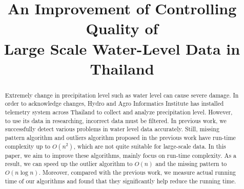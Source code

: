 \documentclass[conference]{IEEEtran}
\begin{document}
\title{An Improvement of Controlling Quality of \\Large Scale Water-Level Data in Thailand}

\author{
\and
{}
\and
{}
}

\maketitle


\begin{abstract}
Extremely change in precipitation level such as water level can cause severe damage. In order to acknowledge changes, Hydro and Agro Informatics Institute has installed telemetry system across Thailand to collect and analyze precipitation level. However, to use its data in researching, incorrect data must be filtered. In previous work, we successfully detect various problems in water level data accurately. Still, missing pattern algorithm and outliers algorithm proposed in the previous work have run-time complexity up to $O(n^2)$, which are not quite suitable for large-scale data. In this paper, we aim to improve these algorithms, mainly focus on run-time complexity. As a result, we can speed up the outlier algorithm to $O(n)$ and the missing pattern to $O(n \log{n})$. Moreover, compared with the previous work, we measure actual running time of our algorithms and found that they significantly help reduce the running time.

\end{abstract}
\end{document}
